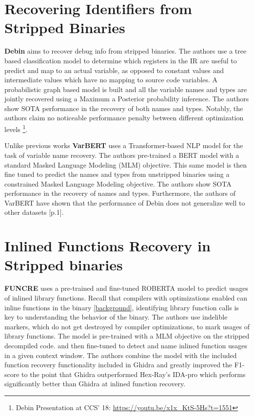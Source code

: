 \section{Recovering Identifiers from Stripped Binaries}
\textbf{Debin} \cite{Debin} aims to recover debug info from stripped binaries. The authors use a tree based classification model to determine which registers in the IR are useful to predict and map to an actual variable, as opposed to constant values and intermediate values which have no mapping to source code variables. A probabilistic graph based model is built and all the variable names and types are jointly recovered using a Maximum a Posterior probability inference. The authors show SOTA performance in the recovery of both names and types. Notably, the authors claim no noticeable performance penalty between different optimization levels \footnote{Debin Presentation at CCS' 18: \url{https://youtu.be/x1x_KtS-5Hs?t=1551}}. 

Unlike previous works \textbf{VarBERT} uses a Transformer-based NLP model for the task of variable name recovery. The authors pre-trained a BERT model with a standard Masked Language Modeling (MLM) objective. This same model is then fine tuned to predict the names and types from unstripped binaries using a constrained Masked Language Modeling objective. The authors show SOTA performance in the recovery of names and types. Furthermore, the authors of VarBERT have shown that the performance of Debin does not generalize well to other datasets \cite{VarBERT}[p.1]. 

\section{Inlined Functions Recovery in Stripped binaries}
\textbf{FUNCRE} uses a pre-trained and fine-tuned ROBERTA model to predict usages of inlined library functions. Recall that compilers with optimizations enabled can inline functions in the binary \ref{background}, identifying library function calls is key to understanding the behavior of the binary. The authors use indelible markers, which do not get destroyed by compiler optimizations, to mark usages of library functions. The model is pre-trained with a MLM objective on the stripped decompiled code. and then fine-tuned to detect and name inlined function usages in a given context window. The authors combine the model with the included function recovery functionality included in Ghidra and greatly improved the F1-score to the point that Ghidra outperformed Hex-Ray's IDA-pro which performs significantly better than Ghidra at inlined function recovery. 

